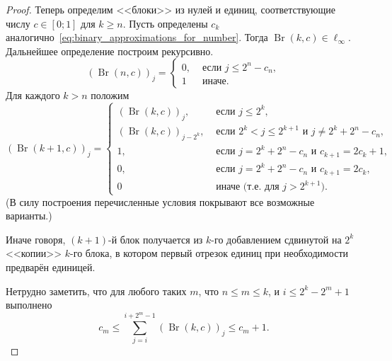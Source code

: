 \begin{proof}
	Теперь определим <<блоки>> из нулей и единиц, соответствующие числу $c\in[0;1]$ для $k \geq n$.
	Пусть определены $c_k$ аналогично~\eqref{eq:binary_approximations_for_number}.
	Тогда $\operatorname{Br}(k,c) \in \ell_\infty$.
	Дальнейшее определение построим рекурсивно.
	\begin{equation}
		(\operatorname{Br}(n,c))_j = \begin{cases}
			0, & \mbox{~если~} j \leq 2^n - c_n,
			\\
			1  & \mbox{~иначе}
			.
		\end{cases}
	\end{equation}
	Для каждого $k > n$ положим
	\begin{equation}
		(\operatorname{Br}(k+1,c))_j = \begin{cases}
			(\operatorname{Br}(k,c))_j, &  \mbox{~если~} j \leq 2^k,
			\\
			(\operatorname{Br}(k,c))_{j-2^k}, &  \mbox{~если~} 2^k < j \leq 2^{k+1} \mbox{~и~} j \neq 2^k + 2^n - c_n,
			\\
			1, & \mbox{~если~} j = 2^k + 2^n - c_n \mbox{~и~} c_{k+1} = 2 c_k + 1,
			\\
			0, & \mbox{~если~} j = 2^k + 2^n - c_n \mbox{~и~} c_{k+1} = 2 c_k,
			\\
			0  & \mbox{~иначе (т.е. для $j > 2^{k+1}$)}
			.
		\end{cases}
	\end{equation}
	(В силу построения перечисленные условия покрывают все возможные варианты.)

	Иначе говоря, $(k+1)$-й блок получается из $k$-го добавлением сдвинутой на $2^k$ <<копии>> $k$-го блока,
	в котором первый отрезок единиц при необходимости предварён единицей.

	Нетрудно заметить, что для любого таких $m$, что $n \leq m \leq k$, и $ i \leq 2^k - 2^m + 1$
	выполнено
	\begin{equation}
		c_m \leq \sum_{j=i}^{i+2^m-1} (\operatorname{Br}(k,c))_j \leq c_{m}+1
		.
	\end{equation}



\end{proof}
